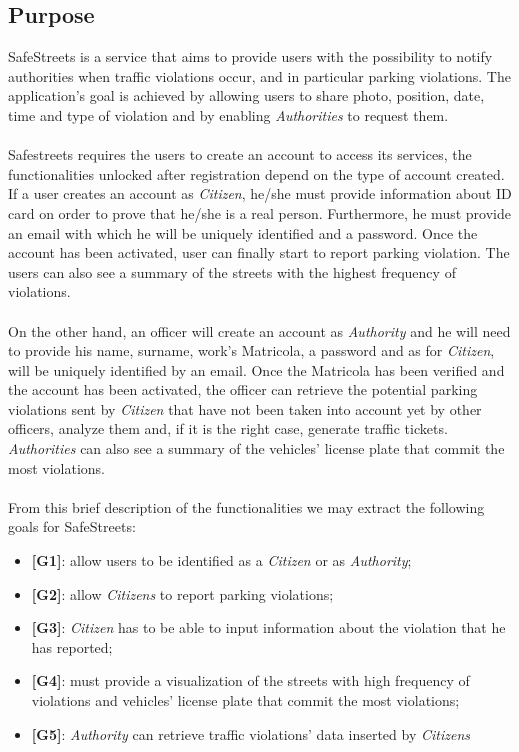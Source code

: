 \documentclass{article}
\begin{document}
\subsection{Purpose}
SafeStreets is a service that aims to provide users with the possibility to notify authorities when traffic 
violations occur, and in particular parking violations. The application's goal is achieved by allowing users 
to share photo, position, date, time and type of violation and by enabling \textit{Authorities} to request them.
\\
\\
Safestreets requires the users to create an account to access its services, the functionalities unlocked after 
registration depend on the type of account created.
\\
If a user creates an account as \textit{Citizen}, he/she must provide information about ID card on order to prove 
that he/she is a real person. Furthermore, he must provide an email with which he will be uniquely identified 
and a password. Once the account has been activated, user can finally start to report parking violation. 
The users can also see a summary of the streets with the highest frequency of violations.
\\
\\
On the other hand, an officer will create an account as \textit{Authority} and he will need to provide his name, surname, 
work's Matricola, a password and as for \textit{Citizen}, will be uniquely identified by an email. Once the Matricola 
has been verified and the account has been activated, the officer can retrieve the potential parking violations 
sent by \textit{Citizen} that have not been taken into account yet by other officers, analyze them and, if it is the 
right case, generate traffic tickets. \textit{Authorities} can also see a summary of the vehicles' license plate that 
commit the most violations.
\\
\\
From this brief description of the functionalities we may extract the following goals for SafeStreets:
\begin{itemize}
    \item \textbf{[G1]}: allow users to be identified as a \textit{Citizen} or as \textit{Authority};
    \item \textbf{[G2]}: allow \textit{Citizens} to report parking violations;
    \item \textbf{[G3]}: \textit{Citizen} has to be able to input information about the violation that he has reported;
    \item \textbf{[G4]}: must provide a visualization of the streets with high frequency of violations and vehicles' license plate that commit the most violations;
    \item \textbf{[G5]}: \textit{Authority} can retrieve traffic violations' data inserted by \textit{Citizens}
\end{itemize}
\end{document}

